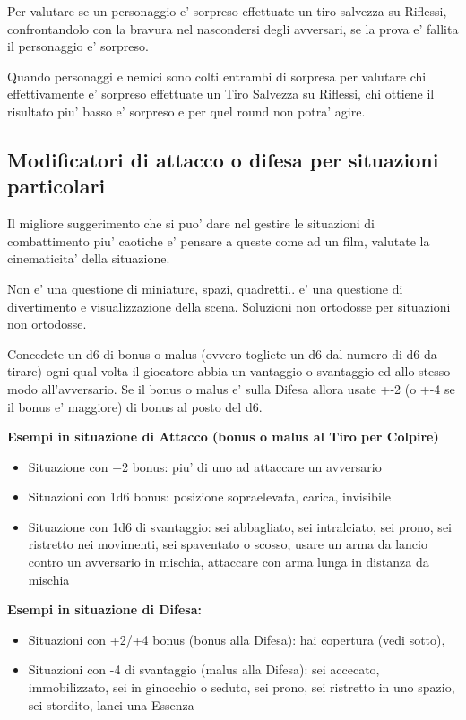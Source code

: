 \documentclass[a4paper,11pt,twoside,openany]{dndbook}
\begin{document}
Per valutare se un personaggio e' sorpreso effettuate un tiro salvezza su Riflessi, confrontandolo con la bravura nel nascondersi degli avversari, se la prova e' fallita il personaggio e' sorpreso. 

Quando personaggi e nemici sono colti entrambi di sorpresa per valutare chi effettivamente e' sorpreso effettuate un Tiro Salvezza su Riflessi, chi ottiene il risultato piu' basso e' sorpreso e per quel round non potra' agire.

\subsection{Modificatori di attacco o difesa per situazioni particolari} 

Il migliore suggerimento che si puo' dare nel gestire le situazioni di combattimento piu' caotiche e' pensare a queste come ad un film, valutate la cinematicita' della situazione.

Non e' una questione di miniature, spazi, quadretti.. e' una questione di divertimento e visualizzazione della scena. Soluzioni non ortodosse per situazioni non ortodosse.

Concedete un d6 di bonus o malus (ovvero togliete un d6 dal numero di d6 da tirare) ogni qual volta il giocatore abbia un vantaggio o svantaggio ed allo stesso modo all'avversario. Se il bonus o malus e' sulla Difesa allora usate +-2 (o +-4 se il bonus e' maggiore) di bonus al posto del d6.

\bigskip

\textbf{Esempi in situazione di Attacco (bonus o malus al Tiro per Colpire)}

\begin{itemize}
	\item Situazione con +2 bonus: piu' di uno ad attaccare un avversario

	\item Situazioni con 1d6 bonus: posizione sopraelevata, carica, invisibile

	\item Situazione con 1d6 di svantaggio: sei abbagliato, sei intralciato, sei prono, sei ristretto nei movimenti, sei spaventato o scosso, usare un arma da lancio contro un avversario in mischia, attaccare con arma lunga in distanza da mischia
\end{itemize}

\textbf{Esempi in situazione di Difesa:}

\begin{itemize}
	\item Situazioni con +2/+4 bonus (bonus alla Difesa): hai copertura (vedi sotto),

	\item Situazioni con -4 di svantaggio (malus alla Difesa): sei accecato, immobilizzato, sei in ginocchio o seduto, sei prono, sei ristretto in uno spazio, sei stordito, lanci una Essenza 
\end{itemize}
\end{document}
